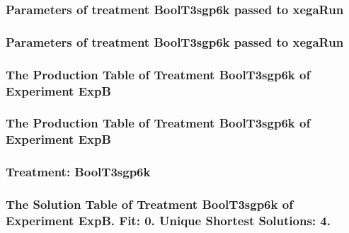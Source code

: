 \documentclass[18pt,c]{beamer}
\begin{document}

 \begin{frame}
 \fontsize{8pt}{9pt}\selectfont
 \frametitle{  Parameters of treatment BoolT3sgp6k passed to xegaRun
 }

 \label{ExpBtParmTable078.tex}  
 \end{frame}


 \begin{frame}
 \fontsize{8pt}{9pt}\selectfont
 \frametitle{  Parameters of treatment BoolT3sgp6k passed to xegaRun
 }

 \label{ExpBtParmTable079.tex}  
 \end{frame}

 \begin{frame}
 \fontsize{8pt}{9pt}\selectfont
 \frametitle{ The Production Table of Treatment BoolT3sgp6k of Experiment ExpB }

 \label{ExpBGrammarTable024.tex}  
 \end{frame}

 \begin{frame}
 \fontsize{8pt}{9pt}\selectfont
 \frametitle{ The Production Table of Treatment BoolT3sgp6k of Experiment ExpB }

 \label{ExpBGrammarTable025.tex}  
 \end{frame}

 \begin{frame}
 \fontsize{8pt}{9pt}\selectfont
 \frametitle{ Treatment: BoolT3sgp6k }

 \label{ExpBStatsTable026.tex}  
 \end{frame}

 \begin{frame}
 \fontsize{8pt}{9pt}\selectfont
 \frametitle{ The Solution Table of Treatment BoolT3sgp6k of Experiment ExpB. Fit: 0. Unique Shortest Solutions: 4. }

 \label{ExpBSolutionTable019.tex}  
 \end{frame}
\end{document}
